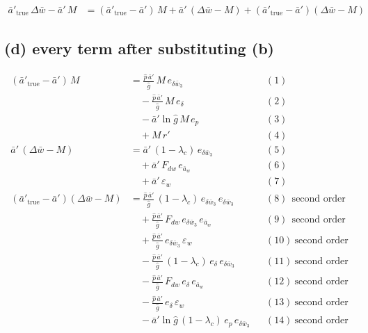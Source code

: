 \documentclass[11pt,a4paper,fontset=none]{ctexart}
\newcommand{\ba}{\bar{a}}
\newcommand{\bw}{\bar{w}}
\newcommand{\dW}{\Delta\bw}
\newcommand{\ap}{\ba'}
\newcommand{\ph}{\hat{p}}
\newcommand{\dl}{\delta}
\newcommand{\gh}{\hat{g}}
\begin{document}
\begin{align*}
\ap_{\mathrm{true}}\,\dW - \ap\,M
  &= (\ap_{\mathrm{true}} - \ap)\,M + \ap\,(\dW - M) + (\ap_{\mathrm{true}} - \ap)(\dW - M)
\end{align*}

\subsection*{(d) every term after substituting (b)}

\begin{align*}
(\ap_{\mathrm{true}} - \ap)\,M
  &= \frac{\ph\,\ap}{\gh}\,M\,e_{\delta\bw_3}                                    && (1) \\
  &\quad - \frac{\ph\,\ap}{\gh}\,M\,e_{\dl}                                      && (2) \\
  &\quad - \ap\ln\gh\,M\,e_p                                                     && (3) \\
  &\quad + M\,r'                                                                 && (4) \\[6pt]
\ap\,(\dW - M)
  &= \ap\,(1-\lambda_c)\,e_{\delta\bw_3}                                         && (5) \\
  &\quad + \ap\,F_{dw}\,e_{\ba_w}                                                && (6) \\
  &\quad + \ap\,\varepsilon_w                                                    && (7) \\[6pt]
(\ap_{\mathrm{true}} - \ap)(\dW - M)
  &= \frac{\ph\,\ap}{\gh}\,(1-\lambda_c)\,e_{\delta\bw_3}\,e_{\delta\bw_3}        && (8)\ \ \text{second order} \\
  &\quad + \frac{\ph\,\ap}{\gh}\,F_{dw}\,e_{\delta\bw_3}\,e_{\ba_w}               && (9)\ \ \text{second order} \\
  &\quad + \frac{\ph\,\ap}{\gh}\,e_{\delta\bw_3}\,\varepsilon_w                   && (10)\ \text{second order} \\
  &\quad - \frac{\ph\,\ap}{\gh}\,(1-\lambda_c)\,e_{\dl}\,e_{\delta\bw_3}          && (11)\ \text{second order} \\
  &\quad - \frac{\ph\,\ap}{\gh}\,F_{dw}\,e_{\dl}\,e_{\ba_w}                       && (12)\ \text{second order} \\
  &\quad - \frac{\ph\,\ap}{\gh}\,e_{\dl}\,\varepsilon_w                           && (13)\ \text{second order} \\
  &\quad - \ap\ln\gh\,(1-\lambda_c)\,e_p\,e_{\delta\bw_3}                          && (14)\ \text{second order} \\

\end{align*}
\end{document}

